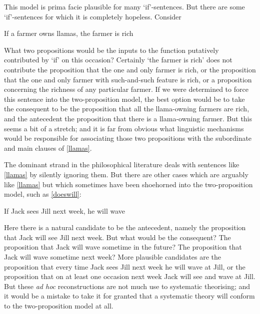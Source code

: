 \documentclass[If.tex]{subfiles}
\begin{document}
This model is prima facie plausible for many ‘if’-sentences. But there are some ‘if’-sentences for which it is completely hopeless. Consider
\begin{prop}
	\nitem \label{llamas} 
	If a farmer owns llamas, the farmer is rich
\end{prop}
What two propositions would be the inputs to the function putatively contributed by ‘if’ on this occasion?  Certainly ‘the farmer is rich’ does not contribute the proposition that the one and only farmer is rich, or the proposition that the one and only farmer with such-and-such feature is rich, or a proposition concerning the richness of any particular farmer. If we were determined to force this sentence into the two-proposition model, the best option would be to take the consequent to be the proposition that all the llama-owning farmers are rich, and the antecedent the proposition that there is a llama-owning farmer. But this seems a bit of a stretch; and it is far from obvious what linguistic mechanisms would be responsible for associating those two propositions with the subordinate and main clauses of \ref{llamas}.

The dominant strand in the philosophical literature deals with sentences like \ref{llamas} by silently ignoring them. But there are other cases which are arguably like \ref{llamas} but which sometimes have been shoehorned into the two-proposition model, such as \ref{doeswill}:
\begin{prop}
	\nitem \label{doeswill} 
	If Jack sees Jill next week, he will wave
\end{prop}
Here there is a natural candidate to be the antecedent, namely the proposition that Jack will see Jill next week. But what would be the consequent? The proposition that Jack will wave sometime in the future? The proposition that Jack will wave sometime next week? More plausible candidates are the proposition that every time Jack sees Jill next week he will wave at Jill, or the proposition that on at least one occasion next week Jack will see and wave at Jill. But these \emph{ad hoc} reconstructions are not much use to systematic theorising; and it would be a mistake to take it for granted that a systematic theory will conform to the two-proposition model at all.
\end{document}
